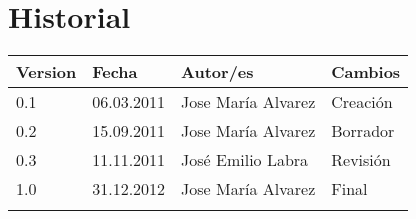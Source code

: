 \chapter*{Historial}
\thispagestyle{empty}

\begin{tabular}{|p{1.3cm}|p{3cm}|p{5cm}|p{5cm}|}  \hline
Version & Fecha & Autor/es & Cambios \\ \hline \hline

0.1 & 06.03.2011 & Jose María Alvarez & Creación  \\
0.2 & 15.09.2011 & Jose María Alvarez & Borrador \\
0.3 & 11.11.2011 & José Emilio Labra & Revisión \\
1.0 & 31.12.2012 & Jose María Alvarez & Final \\
 &  &  & \\ \hline

\hline
\end{tabular}
